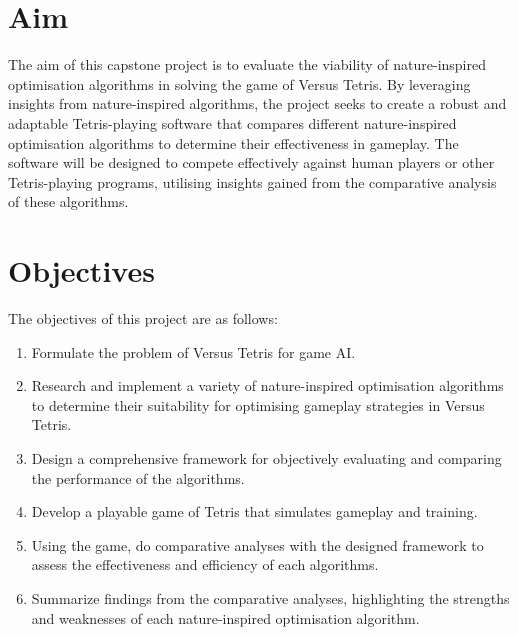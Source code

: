 \documentclass[a4paper, 12pt]{extreport}
\begin{document}
		\section{Aim}
		
			
			The aim of this capstone project is to evaluate the viability of nature-inspired optimisation algorithms in solving the game of Versus Tetris. By leveraging insights from nature-inspired algorithms, the project seeks to create a robust and adaptable Tetris-playing software that compares different nature-inspired optimisation algorithms to determine their effectiveness in gameplay. The software will be designed to compete effectively against human players or other Tetris-playing programs, utilising insights gained from the comparative analysis of these algorithms.
		
		\section{Objectives}
		
			
			The objectives of this project are as follows:
			
			\begin{enumerate}
				\item Formulate the problem of Versus Tetris for game AI.
				\item Research and implement a variety of nature-inspired optimisation algorithms to determine their suitability for optimising gameplay strategies in Versus Tetris.
				\item Design a comprehensive framework for objectively evaluating and comparing the performance of the algorithms.
				\item Develop a playable game of Tetris that simulates gameplay and training.
				\item Using the game, do comparative analyses with the designed framework to assess the effectiveness and efficiency of each algorithms.
				\item Summarize findings from the comparative analyses, highlighting the strengths and weaknesses of each nature-inspired optimisation algorithm.
			\end{enumerate}
		
\end{document}
